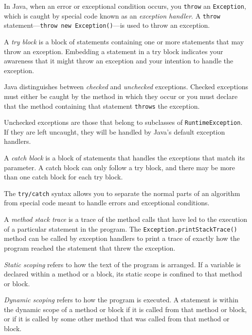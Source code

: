 \begin{SMBL}
\item  In Java, when an error or exceptional condition occurs,
you {\tt throw} an {\tt Exception}, which is caught by special code
known as an {\it exception handler}. A {\tt throw} statement---{\tt throw new Exception()}---is used to throw an exception.

\item   A {\it try block} is a block of statements containing one
or more statements that may throw an exception.   Embedding a statement
in a try block indicates your awareness that it might throw an
exception and your intention to handle the exception.

\item  Java distinguishes between {\it checked} and {\it unchecked}
exceptions.  Checked exceptions must either be caught by the method in
which they occur or you must declare that the method containing that
statement {\tt throws} the exception.


\item  Unchecked exceptions are those that belong to
subclasses of {\tt Runtime\-Exception}. If they are left uncaught, they
will be handled by Java's default exception handlers.


\item  A {\it catch block} is a block of statements that handles
the exceptions that match its parameter.   A catch block can only
follow a try block, and there may be more than one catch block
for each try block.

\item  The {\tt try/catch} syntax allows you to separate the normal
parts of an algorithm from special code meant to handle errors
and exceptional conditions.

\item  A {\it method stack trace} is a trace of the method calls
that have led to the execution of a particular statement in the
program.  The {\tt Exception.print\-StackTrace()} method can be
called by exception handlers to print a trace of exactly how
the program reached the statement that threw the exception.

\item  {\it Static scoping} refers to how the text of the program
is arranged.  If a variable is declared within a method or a block,
its static scope is confined to that method or block.

\item  {\it Dynamic scoping} refers to how the program is executed.
A statement is within the dynamic scope of a method or block if
it is called from that method or block, or if it is called by some
other method that was called from that method or block.


\end{SMBL}
